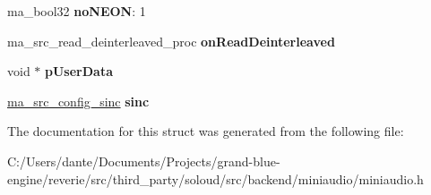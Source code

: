 \begin{DoxyCompactItemize}
ma\+\_\+bool32 {\bfseries no\+N\+E\+ON}\+: 1
\item 
\mbox{\label{structma__src__config_a6c1c533eddf4d0b50c2384f97aa7ae9a}} 
ma\+\_\+src\+\_\+read\+\_\+deinterleaved\+\_\+proc {\bfseries on\+Read\+Deinterleaved}
\item 
\mbox{\label{structma__src__config_a937a422ddff21d4e261bc41e5af90a12}} 
void $\ast$ {\bfseries p\+User\+Data}
\item 
\mbox{\label{structma__src__config_a3cde1179f4139978673bc87b6836efc9}} 
\mbox{\hyperlink{structma__src__config__sinc}{ma\+\_\+src\+\_\+config\+\_\+sinc}} {\bfseries sinc}
\end{DoxyCompactItemize}


The documentation for this struct was generated from the following file\+:\begin{DoxyCompactItemize}
\item 
C\+:/\+Users/dante/\+Documents/\+Projects/grand-\/blue-\/engine/reverie/src/third\+\_\+party/soloud/src/backend/miniaudio/miniaudio.\+h\end{DoxyCompactItemize}
